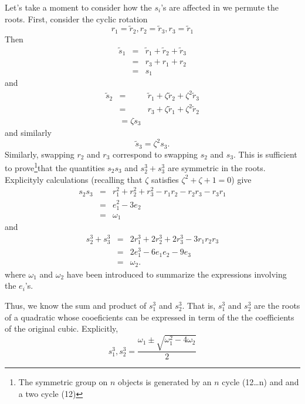 \documentclass{article}
\begin{document}
Let's take a moment to consider how the $s_i$'s are affected
in we permute the roots.  First, consider the cyclic rotation
\begin{equation}
  r_1 = \tilde r_2 ,
  r_2 = \tilde r_3 ,
  r_3 = \tilde r_1 
\end{equation}
Then
\begin{eqnarray}
\tilde s_1 & = & \tilde r_1 + \tilde r_2 + \tilde r_3 \\
       & = & r_3 + r_1 + r_2 \\
       & = & s_1
\end{eqnarray}
and
\begin{eqnarray}
\tilde s_2 & = & \tilde r_1 + \zeta \tilde r_2 +
                       \zeta^2 \tilde r_3 \\
         & = & r_3 + \zeta \tilde r_1 +
                       \zeta^2 \tilde r_2 \\
         & = \zeta s_3
\end{eqnarray}
and similarly
\begin{equation}
  \tilde s_3 = \zeta^2 s_3.
\end{equation}
Similarly, swapping $r_2$ and $r_3$ correspond to 
swapping $s_2$ and $s_3$.  This is sufficient to 
prove\footnote{The symmetric group on $n$ objects
is generated by an $n$ cycle  (12\ldots n) and 
and a two cycle (12)}that the quantities $s_2 s_3$ and $s_2^3 + s_3^3$
are symmetric in the roots.
Explicityly calculations (recalling that $\zeta$ satisfies
$\zeta^2 + \zeta + 1 = 0$) give
\begin{eqnarray}
  s_2 s_3 & = & r_1^2 + r_2^2 + r_3^2 - r_1 r_2 - r_2 r_3 - r_3 r_1\\
     & = & e_1^2 - 3 e_2\\
     & = & \omega_1
\end{eqnarray}
and
\begin{eqnarray}
 s_2 ^3 + s_3^3 & = & 2 r_1^3 + 2 r_2^3 + 2 r_3^3 - 3 r_1 r_2 r_3 \\
   & = & 2 e_1^3 - 6 e_1 e_2 - 9 e_3 \\
   & = & \omega_2.
\end{eqnarray}
where $\omega_1$ and $\omega_2$ have been introduced to summarize
the expressions involving the $e_i$'s.

Thus, we know the sum and product of $s_1^3$ and $s_2^3$.  That is,
$s_1^3$ and $s_2^3$ are the roots of a quadratic whose cooeficients
can be expressed in term of the the coefficients of the original
cubic. Explicitly,
\begin{equation}
 s_1^3, s_2^3 = \frac{\omega_1 \pm \sqrt{\omega_1^2 - 4\omega_2}}{2}
\end{equation}
\end{document}
